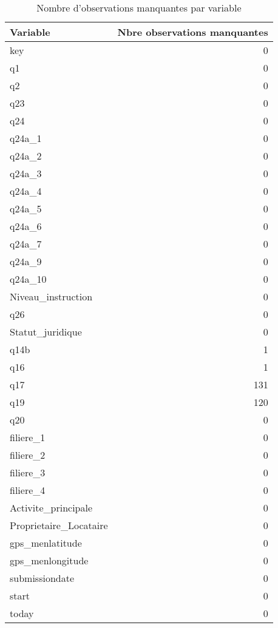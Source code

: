 \documentclass[
  14pt,
]{article}
\begin{document}
\begin{table}

\caption{\label{tab:unnamed-chunk-4}Nombre d'observations
                      manquantes par variable}
\centering
\begin{tabular}[t]{l|r}
\hline
Variable & Nbre observations manquantes\\
\hline
key & 0\\
\hline
q1 & 0\\
\hline
q2 & 0\\
\hline
q23 & 0\\
\hline
q24 & 0\\
\hline
q24a\_1 & 0\\
\hline
q24a\_2 & 0\\
\hline
q24a\_3 & 0\\
\hline
q24a\_4 & 0\\
\hline
q24a\_5 & 0\\
\hline
q24a\_6 & 0\\
\hline
q24a\_7 & 0\\
\hline
q24a\_9 & 0\\
\hline
q24a\_10 & 0\\
\hline
Niveau\_instruction & 0\\
\hline
q26 & 0\\
\hline
Statut\_juridique & 0\\
\hline
q14b & 1\\
\hline
q16 & 1\\
\hline
q17 & 131\\
\hline
q19 & 120\\
\hline
q20 & 0\\
\hline
filiere\_1 & 0\\
\hline
filiere\_2 & 0\\
\hline
filiere\_3 & 0\\
\hline
filiere\_4 & 0\\
\hline
Activite\_principale & 0\\
\hline
Proprietaire\_Locataire & 0\\
\hline
gps\_menlatitude & 0\\
\hline
gps\_menlongitude & 0\\
\hline
submissiondate & 0\\
\hline
start & 0\\
\hline
today & 0\\
\hline
\end{tabular}
\end{table}

\newpage
\end{document}
